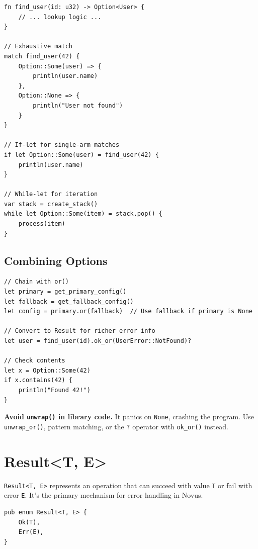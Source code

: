 \begin{lstlisting}
fn find_user(id: u32) -> Option<User> {
    // ... lookup logic ...
}

// Exhaustive match
match find_user(42) {
    Option::Some(user) => {
        println(user.name)
    },
    Option::None => {
        println("User not found")
    }
}

// If-let for single-arm matches
if let Option::Some(user) = find_user(42) {
    println(user.name)
}

// While-let for iteration
var stack = create_stack()
while let Option::Some(item) = stack.pop() {
    process(item)
}
\end{lstlisting}

\subsection{Combining Options}

\begin{lstlisting}
// Chain with or()
let primary = get_primary_config()
let fallback = get_fallback_config()
let config = primary.or(fallback)  // Use fallback if primary is None

// Convert to Result for richer error info
let user = find_user(id).ok_or(UserError::NotFound)?

// Check contents
let x = Option::Some(42)
if x.contains(42) {
    println("Found 42!")
}
\end{lstlisting}

\begin{warningbox}
\textbf{Avoid \texttt{unwrap()} in library code.} It panics on \texttt{None}, crashing the program. Use \texttt{unwrap\_or()}, pattern matching, or the \texttt{?} operator with \texttt{ok\_or()} instead.
\end{warningbox}

\section{Result\textless T, E\textgreater}
\label{sec:result}

\texttt{Result<T, E>} represents an operation that can succeed with value \texttt{T} or fail with error \texttt{E}. It's the primary mechanism for error handling in Novus.

\begin{lstlisting}
pub enum Result<T, E> {
    Ok(T),
    Err(E),
}
\end{lstlisting}

